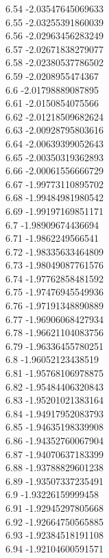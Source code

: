 {6.54	-2.03547645069633\\
6.55	-2.03255391860039\\
6.56	-2.02963456283249\\
6.57	-2.02671838279077\\
6.58	-2.02380537786502\\
6.59	-2.0208955474367\\
6.6	-2.01798889087895\\
6.61	-2.0150854075566\\
6.62	-2.01218509682624\\
6.63	-2.00928795803616\\
6.64	-2.00639399052643\\
6.65	-2.00350319362893\\
6.66	-2.00061556666729\\
6.67	-1.99773110895702\\
6.68	-1.99484981980542\\
6.69	-1.99197169851171\\
6.7	-1.98909674436694\\
6.71	-1.9862249566541\\
6.72	-1.98335633464809\\
6.73	-1.98049087761576\\
6.74	-1.97762858481592\\
6.75	-1.97476945549936\\
6.76	-1.97191348890889\\
6.77	-1.96906068427934\\
6.78	-1.96621104083756\\
6.79	-1.96336455780251\\
6.8	-1.96052123438519\\
6.81	-1.95768106978875\\
6.82	-1.95484406320843\\
6.83	-1.95201021383164\\
6.84	-1.94917952083793\\
6.85	-1.94635198339908\\
6.86	-1.94352760067904\\
6.87	-1.94070637183399\\
6.88	-1.93788829601238\\
6.89	-1.93507337235491\\
6.9	-1.93226159999458\\
6.91	-1.92945297805668\\
6.92	-1.92664750565885\\
6.93	-1.92384518191108\\
6.94	-1.92104600591571\\
}
